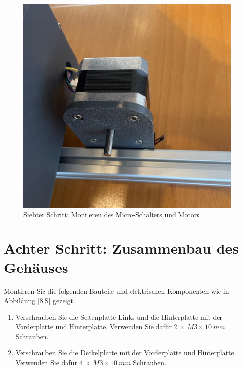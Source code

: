 \begin{figure}[H]
	\begin{center}
		\includegraphics[width=\textwidth]{Images/7Schr.jpg}
		\caption{Siebter Schritt: Montieren des Micro-Schalters und Motors} \label{7.S}
	\end{center}
\end{figure}


\section{Achter Schritt: Zusammenbau des Gehäuses}

Montieren Sie die folgenden Bauteile und elektrischen Komponenten wie in Abbildung \ref{8.S} gezeigt.

\begin{enumerate}
	\item Verschrauben Sie die Seitenplatte Links und die Hinterplatte mit der Vorderplatte und Hinterplatte. Verwenden Sie dafür 2 $\times$ $ M3 \times 10 \ mm $ Schrauben.
	\item Verschrauben Sie die Deckelplatte mit der Vorderplatte und Hinterplatte. Verwenden Sie dafür 4 $\times$ $ M3 \times 10 \ mm $ Schrauben.
\end{enumerate}

